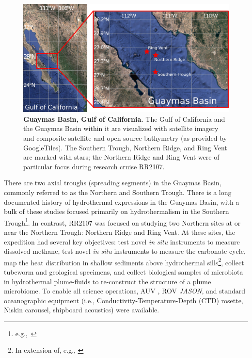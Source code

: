 \begin{figure}[!ht]
  \centering
  \includegraphics[width=\columnwidth]{figures/ops_guaymas.png}
  \caption[Guaymas Basin, Gulf of California.]{\textbf{Guaymas Basin, Gulf of California.} The Gulf of California and the Guaymas Basin within it are visualized with satellite imagery and composite satellite and open-source bathymetry (as provided by GoogleTiles). The Southern Trough, Northern Ridge, and Ring Vent are marked with stars; the Northern Ridge and Ring Vent were of particular focus during research cruise RR2107.}
  \label{fig:ops_map}
\end{figure}

There are two axial troughs (spreading segments) in the Guaymas Basin, commonly referred to as the Northern and Southern Trough. There is a long documented history of hydrothermal expressions in the Guaymas Basin, with a bulk of these studies focused primarily on hydrothermalism in the Southern Trough\footnote{e.g.,~\cite{ondreas2018recent, teske2016guaymas, seewald1994variations, von1985chemistry, lonsdale1985hydrothermal}}. In contrast, RR2107 was focused on studying two Northern sites at or near the Northern Trough: Northern Ridge and Ring Vent. At these sites, the expedition had several key objectives: test novel \emph{in situ} instruments to measure dissolved methane\autocite{kapit2021dissolved,kapit2021measurement,michel2022gas}, test novel \emph{in situ} instruments to measure the carbonate cycle, map the heat distribution in shallow sediments above hydrothermal sills\footnote{In extension of, e.g., \autocite{neumann2022heat}}, collect tubeworm and geological specimens, and collect biological samples of microbiota in hydrothermal plume-fluids to re-construct the structure of a plume microbiome. To enable all science operations, AUV \Sentry, ROV \emph{JASON}, and standard oceanographic equipment (i.e., Conductivity-Temperature-Depth (CTD) rosette, Niskin carousel, shipboard acoustics) were available.


